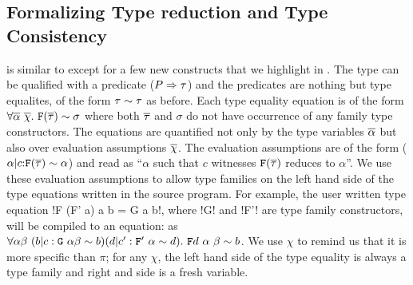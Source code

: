 \documentclass[format=acmsmall,manuscript,screen,nonacm,margin=1in,11pt]{acmart}
\begin{document}
\subsection{Formalizing Type reduction and Type Consistency}\label{subsec:tf-constrained-formal}
\QLTF is similar to \CLTF except for a few new constructs that
we highlight in . The type can be qualified with a predicate ($P\Rightarrow\tau$)
and the predicates are nothing but type equalites, of the form $\tau\mathrel{\sim}\tau$ as before.
Each type equality equation is of the form $\forall\overline{\alpha}~\overline{\chi}.~\texttt{F}(\overline{\tau})\mathrel{\sim}\sigma$
where both $\overline{\tau}$ and $\sigma$ do not have occurrence of any family type constructors. 
The equations are quantified not only by the type variables $\overline{\alpha}$
but also over evaluation assumptions $\overline{\chi}$.
The evaluation assumptions are of the form ($\alpha|c{:}\texttt{F}(\overline{\tau})\mathrel{\sim}\alpha$) and read as
``$\alpha$ such that $c$ witnesses $\texttt{F}(\overline{\tau})$ reduces to $\alpha$''.
We use these evaluation assumptions to allow type families on the left hand side
of the type equations written in the source program. For example,
the user written type equation  !F (F' a) a b = G a b!, where !G! and !F'! are type family constructors,
will be compiled to an equation: as
$\forall\alpha\beta~(b|c:\texttt{G}~\alpha\beta \mathrel{\sim} b)(d|c':\texttt{F}'~\alpha\mathrel{\sim} d).~\texttt{F}d~\alpha~\beta
\mathrel{\sim} b$.
We use $\chi$ to remind us that it is more specific than $\pi$; for any $\chi$,
the left hand side of the type equality is always a type family and right and side is a fresh variable.
\end{document}
